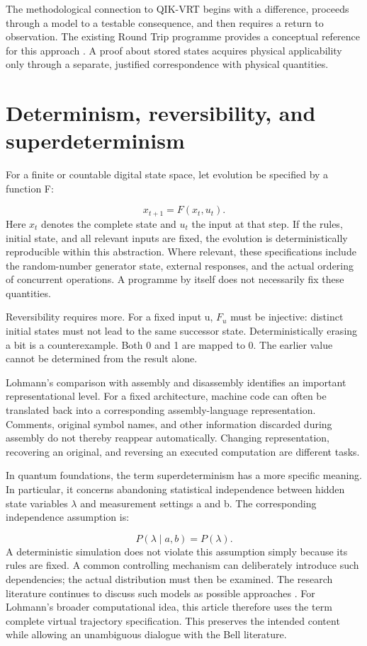 The methodological connection to QIK-VRT begins with a difference, proceeds through a model to a testable consequence, and then requires a return to observation. The existing Round Trip programme provides a conceptual reference for this approach \cite{Q1}. A proof about stored states acquires physical applicability only through a separate, justified correspondence with physical quantities.

\section{Determinism, reversibility, and superdeterminism}\label{en:sec2}
For a finite or countable digital state space, let evolution be specified by a function F:

\begin{equation}\label{en:eq1}
x_{t+1}=F(x_t,u_t).
\end{equation}
Here \(x_t\) denotes the complete state and \(u_t\) the input at that step. If the rules, initial state, and all relevant inputs are fixed, the evolution is deterministically reproducible within this abstraction. Where relevant, these specifications include the random-number generator state, external responses, and the actual ordering of concurrent operations. A programme by itself does not necessarily fix these quantities.

Reversibility requires more. For a fixed input u, \(F_u\) must be injective: distinct initial states must not lead to the same successor state. Deterministically erasing a bit is a counterexample. Both 0 and 1 are mapped to 0. The earlier value cannot be determined from the result alone.

Lohmann's comparison with assembly and disassembly identifies an important representational level. For a fixed architecture, machine code can often be translated back into a corresponding assembly-language representation. Comments, original symbol names, and other information discarded during assembly do not thereby reappear automatically. Changing representation, recovering an original, and reversing an executed computation are different tasks.

In quantum foundations, the term superdeterminism has a more specific meaning. In particular, it concerns abandoning statistical independence between hidden state variables \(\lambda\) and measurement settings a and b. The corresponding independence assumption is:

\begin{equation}\label{en:eq2}
P(\lambda\mid a,b)=P(\lambda).
\end{equation}
A deterministic simulation does not violate this assumption simply because its rules are fixed. A common controlling mechanism can deliberately introduce such dependencies; the actual distribution must then be examined. The research literature continues to discuss such models as possible approaches \cite{10}. For Lohmann's broader computational idea, this article therefore uses the term complete virtual trajectory specification. This preserves the intended content while allowing an unambiguous dialogue with the Bell literature.

